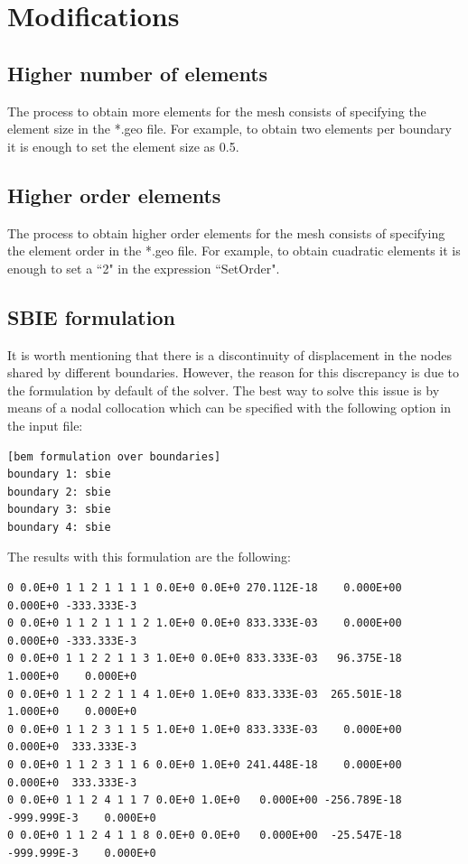 \documentclass[A4]{article}
\begin{document}
\section{Modifications}

\subsection{Higher number of elements}

The process to obtain more elements for the mesh consists of specifying the element size in the *.geo file. For example, to obtain two elements per boundary it is enough to set the element size as 0.5.  

\subsection{Higher order elements}

The process to obtain higher order elements for the mesh consists of specifying the element order in the *.geo file. For example, to obtain cuadratic elements it is enough to set a ``2" in the expression ``SetOrder". 

\subsection{SBIE formulation}

It is worth mentioning that there is a discontinuity of displacement in the nodes shared by different boundaries. However, the reason for this discrepancy is due to the formulation by default of the solver. The best way to solve this issue is by means of a nodal collocation which can be specified with the following option in the input file: 

\begin{Verbatim}
[bem formulation over boundaries]
boundary 1: sbie
boundary 2: sbie
boundary 3: sbie
boundary 4: sbie
\end{Verbatim}

The results with this formulation are the following:

\begin{Verbatim}
0 0.0E+0 1 1 2 1 1 1 1 0.0E+0 0.0E+0 270.112E-18    0.000E+00    0.000E+0 -333.333E-3
0 0.0E+0 1 1 2 1 1 1 2 1.0E+0 0.0E+0 833.333E-03    0.000E+00    0.000E+0 -333.333E-3
0 0.0E+0 1 1 2 2 1 1 3 1.0E+0 0.0E+0 833.333E-03   96.375E-18    1.000E+0    0.000E+0
0 0.0E+0 1 1 2 2 1 1 4 1.0E+0 1.0E+0 833.333E-03  265.501E-18    1.000E+0    0.000E+0
0 0.0E+0 1 1 2 3 1 1 5 1.0E+0 1.0E+0 833.333E-03    0.000E+00    0.000E+0  333.333E-3
0 0.0E+0 1 1 2 3 1 1 6 0.0E+0 1.0E+0 241.448E-18    0.000E+00    0.000E+0  333.333E-3
0 0.0E+0 1 1 2 4 1 1 7 0.0E+0 1.0E+0   0.000E+00 -256.789E-18 -999.999E-3    0.000E+0
0 0.0E+0 1 1 2 4 1 1 8 0.0E+0 0.0E+0   0.000E+00  -25.547E-18 -999.999E-3    0.000E+0
\end{Verbatim}
\end{document}
